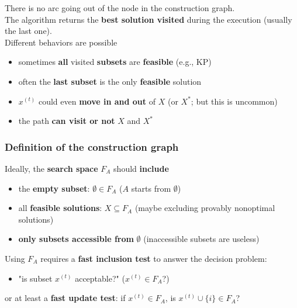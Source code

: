 \documentclass[11pt]{article}
\begin{document}
	There is no arc going out of the node in the construction graph.\\
	
	The algorithm returns the \textbf{best solution visited} during the execution (usually the last one).\\
	
	Different behaviors are possible
	\begin{itemize}
		\item sometimes \textbf{all} visited \textbf{subsets} are \textbf{feasible} (e.g., KP)
		\item often the \textbf{last subset} is the only \textbf{feasible} solution
		\item $x^{(t)}$ could even \textbf{move in and out} of $X$ (or $X^\ast$; but this is uncommon)
		\item the path \textbf{can visit or not} $X$ and $X^\ast$
	\end{itemize}
	
	\newpage
	
	\subsubsection{Definition of the construction graph}
	Ideally, the \textbf{search space} $F_A$ should \textbf{include}
	\begin{itemize}
		\item the \textbf{empty subset}: $\emptyset \in F_A$ ($A$ starts from $\emptyset$)
		\item all \textbf{feasible solutions}: $X \subseteq F_A$ (maybe excluding provably nonoptimal solutions)
		\item \textbf{only subsets accessible from} $\emptyset$ (inaccessible subsets are useless)
	\end{itemize}
	
	Using $F_A$ requires a \textbf{fast inclusion test} to answer the decision problem:
	\begin{itemize}[label*=]
		\item "is subset $x^{(t)}$ acceptable?" ($x^{(t)} \in F_A$?)
	\end{itemize}
	or at least a \textbf{fast update test}: if $x^{(t)} \in F_A$, is $x^{(t)} \cup \{i\} \in F_A$? \\
	
\end{document}
